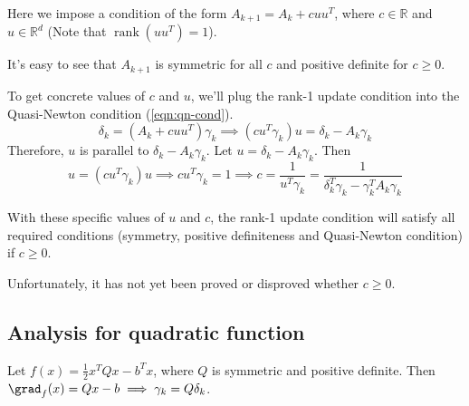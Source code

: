 Here we impose a condition of the form $A_{k+1} = A_k + cuu^T$,
where $c \in \mathbb{R}$ and $u \in \mathbb{R}^d$
(Note that $\operatorname{rank}(uu^T) = 1$).

It's easy to see that $A_{k+1}$ is symmetric for all $c$
and positive definite for $c \ge 0$.

To get concrete values of $c$ and $u$,
we'll plug the rank-1 update condition into the Quasi-Newton condition (\ref{eqn:qn-cond}).
\[ \delta_k = (A_k + cuu^T)\gamma_k \implies (cu^T\gamma_k)u = \delta_k - A_k\gamma_k \]
Therefore, $u$ is parallel to $\delta_k - A_k\gamma_k$. Let $u = \delta_k - A_k\gamma_k$.
Then
\[ u = (cu^T\gamma_k)u \implies cu^T\gamma_k = 1
\implies c = \frac{1}{u^T\gamma_k} = \frac{1}{\delta_k^T\gamma_k - \gamma_k^TA_k\gamma_k} \]

With these specific values of $u$ and $c$,
the rank-1 update condition will satisfy all required conditions
(symmetry, positive definiteness and Quasi-Newton condition) if $c \ge 0$.

Unfortunately, it has not yet been proved or disproved whether $c \ge 0$.

\subsection{Analysis for quadratic function}

Let $f(x) = \frac{1}{2}x^TQx - b^Tx$, where $Q$ is symmetric and positive definite.
Then $\grad_f(x) = Qx - b \implies \gamma_k = Q\delta_k$.

